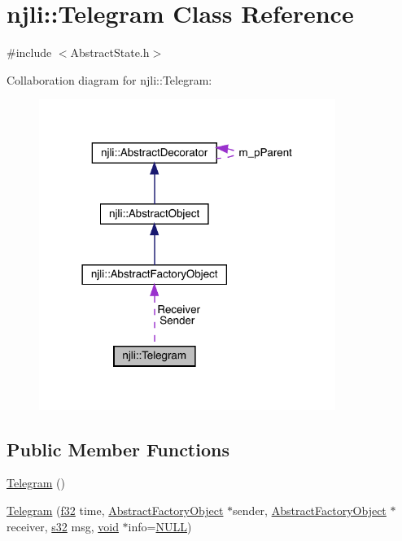 \hypertarget{classnjli_1_1_telegram}{}\section{njli\+:\+:Telegram Class Reference}
\label{classnjli_1_1_telegram}


{\ttfamily \#include $<$Abstract\+State.\+h$>$}



Collaboration diagram for njli\+:\+:Telegram\+:\nopagebreak
\begin{figure}[H]
\begin{center}
\leavevmode
\includegraphics[width=273pt]{classnjli_1_1_telegram__coll__graph}
\end{center}
\end{figure}
\subsection*{Public Member Functions}
\begin{DoxyCompactItemize}
\item 
\mbox{\hyperlink{classnjli_1_1_telegram_aa11c66843172eabb2329c15a4d7ebe05}{Telegram}} ()
\item 
\mbox{\hyperlink{classnjli_1_1_telegram_ab4334c9796b4c8a8bbc3727061059c3d}{Telegram}} (\mbox{\hyperlink{_util_8h_a5f6906312a689f27d70e9d086649d3fd}{f32}} time, \mbox{\hyperlink{classnjli_1_1_abstract_factory_object}{Abstract\+Factory\+Object}} $\ast$sender, \mbox{\hyperlink{classnjli_1_1_abstract_factory_object}{Abstract\+Factory\+Object}} $\ast$receiver, \mbox{\hyperlink{_util_8h_aa62c75d314a0d1f37f79c4b73b2292e2}{s32}} msg, \mbox{\hyperlink{_thread_8h_af1e856da2e658414cb2456cb6f7ebc66}{void}} $\ast$info=\mbox{\hyperlink{_util_8h_a070d2ce7b6bb7e5c05602aa8c308d0c4}{N\+U\+LL}})
\end{DoxyCompactItemize}
